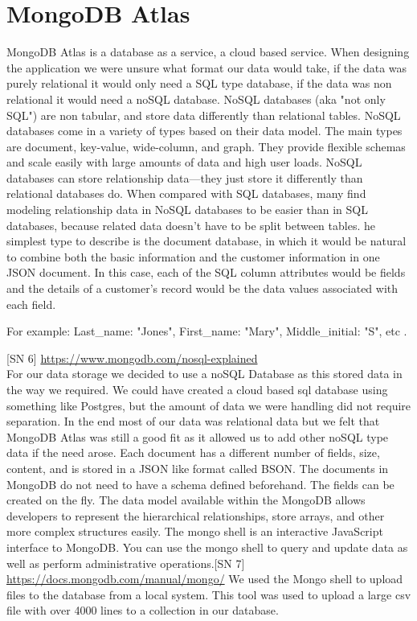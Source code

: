 \section{MongoDB Atlas}
MongoDB Atlas is a database as a service, a cloud based service.
When designing the application we were unsure what format our data would take, if the data was purely relational it would only need a SQL type database, if the data was non relational it would need a noSQL database. 
NoSQL databases (aka "not only SQL") are non tabular, and store data differently than relational tables. NoSQL databases come in a variety of types based on their data model. The main types are document, key-value, wide-column, and graph. They provide flexible schemas and scale easily with large amounts of data and high user loads.  NoSQL databases can store relationship data—they just store it differently than relational databases do. When compared with SQL databases, many find modeling relationship data in NoSQL databases to be easier than in SQL databases, because related data doesn’t have to be split between tables. he simplest type to describe is the document database, in which it would be natural to combine both the basic information and the customer information in one JSON document. In this case, each of the SQL column attributes would be fields and the details of a customer’s record would be the data values associated with each field.

For example: Last\_name: "Jones", First\_name: "Mary", Middle\_initial: "S", etc .


[SN 6] \url{https://www.mongodb.com/nosql-explained}\\
For our data storage we decided to use a noSQL Database as this stored data in the way we required. We could have created a cloud based sql database using something like Postgres, but the amount of data we were handling did not require separation.
In the end most of our data was relational data but we felt that MongoDB Atlas was still a good fit as it allowed us to add other noSQL type data if the need arose. Each document has a different number of fields, size, content, and is stored in a JSON like format called BSON. The documents in MongoDB do not need to have a schema defined beforehand. The fields can be created on the fly. The data model available within the MongoDB allows developers to represent the hierarchical relationships, store arrays, and other more complex structures easily.
The mongo shell is an interactive JavaScript interface to MongoDB. You can use the mongo shell to query and update data as well as perform administrative operations.[SN 7] \url{https://docs.mongodb.com/manual/mongo/}
We used the Mongo shell to upload files to the database from a local system. This tool was used to upload a large csv file with over 4000 lines to a collection in our database.

